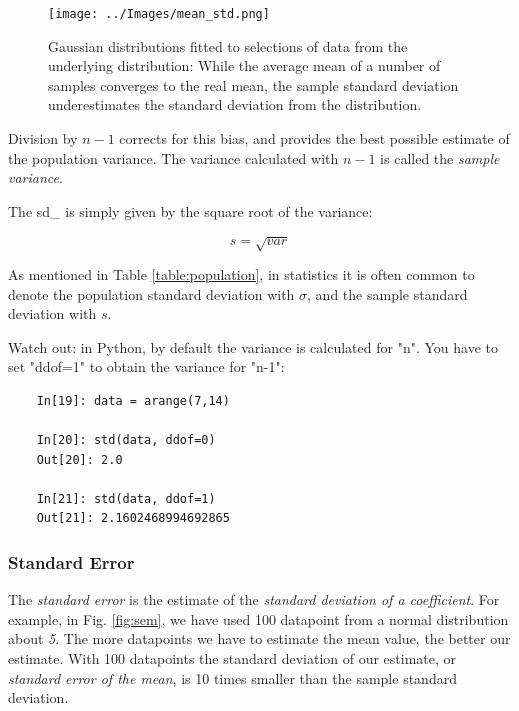 \begin{figure}[ht]
  \centering
  \texttt{[image: ../Images/mean\_std.png]}\\
  \caption{Gaussian distributions fitted to selections of data from the underlying distribution: While the average mean of a number of samples converges to the real mean, the sample standard deviation underestimates the standard deviation from the distribution.}\label{fig:mean_std}
\end{figure}

Division by $n-1$ corrects for this bias, and provides the best possible estimate of the population variance. The variance calculated with $n-1$ is called the \emph{sample variance}.


The \gls{sd_}  is simply given by the square root of the variance:

\begin{equation}
  s = \sqrt{var}
\end{equation}

As mentioned in Table \ref{table:population}, in statistics it is often common to denote the population standard deviation with $\sigma$, and the sample standard deviation with $s$.

Watch out: in Python, by default the variance is calculated for "n". You have to set "ddof=1" to obtain the variance for "n-1":

\begin{lstlisting}
    In[19]: data = arange(7,14)

    In[20]: std(data, ddof=0)
    Out[20]: 2.0

    In[21]: std(data, ddof=1)
    Out[21]: 2.1602468994692865
\end{lstlisting}

\subsubsection{Standard Error} 

The \emph{standard error} is the estimate of the \emph{standard deviation of a coefficient}. For example, in Fig. \ref{fig:sem}, we have used 100 datapoint from a normal distribution about \emph{5}. The more datapoints we have to estimate the mean value, the better our estimate. With 100 datapoints the standard deviation of our estimate, or \emph{standard error of the mean}, is 10 times smaller than the sample standard deviation.

